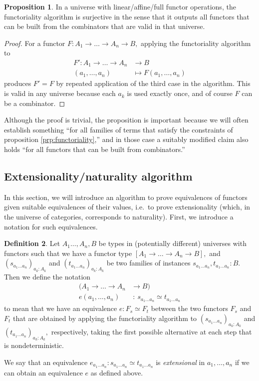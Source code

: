 \documentclass[a4paper]{article}
\theoremstyle{definition}
\newtheorem{definition}{Definition}[section]
\newtheorem{proposition}[definition]{Proposition}
\theoremstyle{remark}
\newcommand{\defn}{\emph}
\renewcommand{\equiv}{\simeq}
\begin{document}
\begin{proposition}
  In a universe with linear/affine/full functor operations, the functoriality algorithm
  is surjective in the sense that it outputs all functors that can be built from the
  combinators that are valid in that universe.
\end{proposition}
\vspace{-1ex}
\begin{proof}
  For a functor $F : A_1 \to \dots \to A_n \to B,$ applying the functoriality algorithm to
  \begin{align*}
    F' : A_1 \to \dots \to A_n &\to     B\\
         (a_1,\ldots,a_n)      &\mapsto F(a_1,\ldots,a_n)
  \end{align*}
  produces $F' = F$ by repeated application of the third case in the algorithm. This is
  valid in any universe because each $a_k$ is used exactly once, and of course $F$ can be
  a combinator.
\end{proof}

Although the proof is trivial, the proposition is important because we will often
establish something ``for all families of terms that satisfy the constraints of
proposition \ref{prp:functoriality},'' and in those case a suitably modified claim also
holds ``for all functors that can be built from combinators.''

\subsection{Extensionality/naturality algorithm}

In this section, we will introduce an algorithm to prove equivalences of functors given
suitable equivalences of their values, i.e.\ to prove extensionality (which, in the
universe of categories, corresponds to naturality).
First, we introduce a notation for such equivalences.

\begin{definition}
  \label{def:extensional-equivalence}
  Let $A_1\ldots,A_n,B$ be types in (potentially different) universes with functors such
  that we have a functor type $[A_1 \to \dots \to A_n \to B],$ and
  $(s_{a_1 \ldots a_n})_{a_k : A_k}$ and $(t_{a_1 \ldots a_n})_{a_k : A_k}$ be two families
  of instances $s_{a_1 \ldots a_n},t_{a_1 \ldots a_n} : B.$ Then we define the notation
  \begin{align*}
    (A_1 \to \dots \to A_n &\to   B)\\
    e(a_1,\ldots,a_n)      &\ :\  s_{a_1 \ldots a_n} \equiv t_{a_1 \ldots a_n}
  \end{align*}
  to mean that we have an equivalence $e : F_s \equiv F_t$ between the two functors
  $F_s$ and $F_t$ that are obtained by applying the functoriality algorithm to
  $(s_{a_1 \ldots a_n})_{a_k : A_k}$ and $(t_{a_1 \ldots a_n})_{a_k : A_k},$
  respectively, taking the first possible alternative at each step that is nondeterministic.

  We say that an equivalence $e_{a_1 \ldots a_n} : s_{a_1 \ldots a_n} \equiv t_{a_1 \ldots a_n}$
  is \defn{extensional} in $a_1,\ldots,a_n$ if we can obtain an equivalence $e$ as defined above.
\end{definition}
\end{document}
